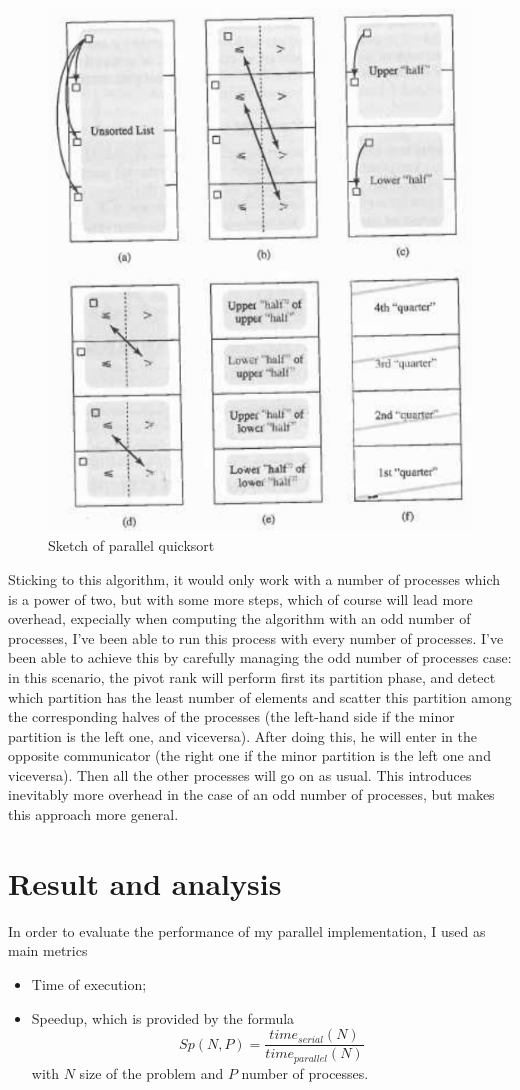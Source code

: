 \documentclass{article}
\begin{document}
	\begin{figure}[h]
		\centering
		\includegraphics[height=0.7\linewidth]{Parallel_quicksort}
		\caption{Sketch of parallel quicksort}
		\label{fig:parallelquicksort}
	\end{figure}
	
	
	Sticking to this algorithm, it would only work with a number of processes which is a power of two, but with some more steps, which of course will lead more overhead, expecially when computing the algorithm with an odd number of processes, I've been able to run this process with every number of processes. I've been able to achieve this by carefully managing the odd number of processes case: in this scenario, the pivot rank will perform first its partition phase, and detect which partition has the least number of elements and scatter this partition among the corresponding halves of the processes (the left-hand side if the minor partition is the left one, and viceversa). After doing this, he will enter in the opposite communicator (the right one if the minor partition is the left one and viceversa). Then all the other processes will go on as usual.
	This introduces inevitably more overhead in the case of an odd number of processes, but makes this approach more general.
	
	\section{Result and analysis}
	
	In order to evaluate the performance of my parallel implementation, I used as main metrics 
	\begin{itemize}
		\item Time of execution;
		\item Speedup, which is provided by the formula $$Sp(N,P)=\frac{time_{serial}(N)}{time_{parallel}(N)}$$ with $N$ size of the problem and $P$ number of processes.
	\end{itemize}
	
\end{document}
